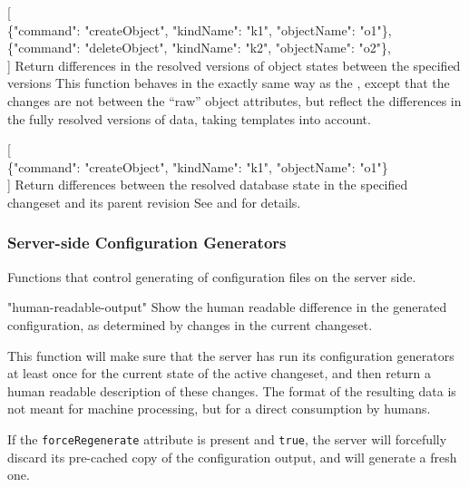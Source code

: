 \documentclass{article}
\begin{document}
    {[ \\
    \{"command": "createObject", "kindName": "k1", "objectName": "o1"\}, \\
    \{"command": "deleteObject", "kindName": "k2", "objectName": "o2"\}, \\
    ]}
    {Return differences in the resolved versions of object states between the specified versions}
    {This function behaves in the exactly same way as the , except that the changes are not
    between the ``raw'' object attributes, but reflect the differences in the fully resolved versions of data, taking
    templates  into account.}

    {[ \\
    \{"command": "createObject", "kindName": "k1", "objectName": "o1"\} \\
    ]}
    {Return differences between the resolved database state in the specified changeset and its parent revision}
    {See  and  for details.}

\subsubsection{Server-side Configuration Generators}
\label{sec:api-group-conf-generators}

Functions that control generating of configuration files on the server side.

    {"human-readable-output"}
    {Show the human readable difference in the generated configuration, as determined by changes in the current
    changeset.}
    {This function will make sure that the server has run its configuration generators at least once for the current
    state of the active changeset, and then return a human readable description of these changes.  The format of the
    resulting data is not meant for machine processing, but for a direct consumption by humans.

    If the {\tt forceRegenerate} attribute is present and {\tt true}, the server will forcefully discard its pre-cached
    copy of the configuration output, and will generate a fresh one.}
\end{document}
